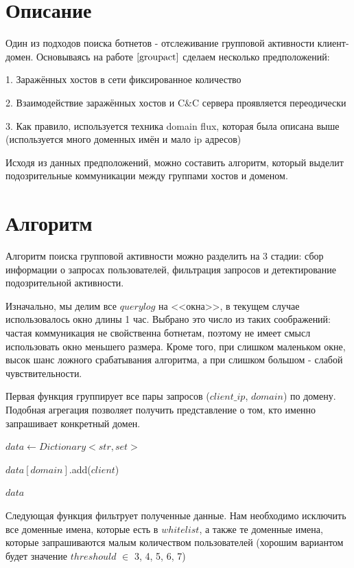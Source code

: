 \documentclass[14pt]{extreport}
\begin{document}
	\section{Описание}
	Один из подходов поиска ботнетов - отслеживание групповой активности клиент-домен. Основываясь на работе $\cite{groupact}$ сделаем несколько предположений:
	
	1. Заражённых хостов в сети фиксированное количество
	
	2. Взаимодействие заражённых хостов и C\&C сервера проявляется переодически
	
	3. Как правило, используется техника domain flux, которая была описана выше (используется много доменных имён и мало ip адресов)
	
	Исходя из данных предположений, можно составить алгоритм, который выделит подозрительные коммуникации между группами хостов и доменом.
	
	\section{Алгоритм}
	
	Алгоритм поиска групповой активности можно разделить на 3 стадии: сбор информации о запросах пользователей, фильтрация запросов и детектирование подозрительной активности. 
	
	Изначально, мы делим все $querylog$ на <<окна>>, в текущем случае использовалось окно длины 1 час. Выбрано это число из таких соображений: частая коммуникация не свойственна ботнетам, поэтому не имеет смысл использовать окно меньшего размера. Кроме того, при слишком маленьком окне, высок шанс ложного срабатывания алгоритма, а при слишком большом - слабой чувствительности.
	
	Первая функция группирует все пары запросов ($client\_ip$, $domain$) по домену. Подобная агрегация позволяет получить представление о том, кто именно запрашивает конкретный домен.
	\begin{algorithmic}
	\State $data\gets Dictionary<str, set>$
	
		\State $data[domain]$.add($client$)
	\EndFor
	
	\State \Return $data$
	\EndFunction
	\end{algorithmic}

	Следующая функция фильтрует полученные данные. Нам необходимо исключить все доменные имена, которые есть в $whitelist$, а также те доменные имена, которые запрашиваются малым количеством пользователей (хорошим вариантом будет значение $threshould$ $\in$ 3, 4, 5, 6, 7)
	
\end{document}

